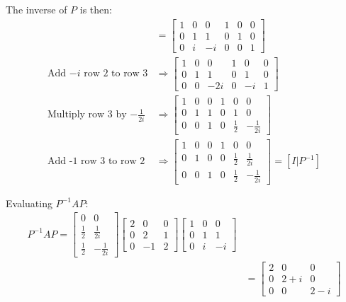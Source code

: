 \documentclass[11pt]{homework}
\begin{document}
The inverse of $P$ is then:
\begin{align*}
[P|I] &= 
  \left[
  \begin{array}{ccc|ccc}
    1 & 0 & 0 & 1 & 0 & 0 \\
    0 & 1 & 1 & 0 & 1 & 0 \\
    0 & i & -i & 0 & 0 & 1 
  \end{array}
  \right] \\
\text{Add $-i$ row 2 to row 3}
  &\Rightarrow
  \left[
  \begin{array}{ccc|ccc}
    1 & 0 & 0   & 1 & 0  & 0 \\
    0 & 1 & 1   & 0 & 1  & 0 \\
    0 & 0 & -2i & 0 & -i & 1 
  \end{array}
  \right] \\
\text{Multiply row 3 by $-\frac{1}{2i}$}
  &\Rightarrow
  \left[
  \begin{array}{ccc|ccc}
    1 & 0 & 0 & 1 & 0  & 0 \\
    0 & 1 & 1 & 0 & 1  & 0 \\
    0 & 0 & 1 & 0 & \frac{1}{2} & -\frac{1}{2i}
  \end{array}
  \right] \\
\text{Add -1 row 3 to row 2}
  &\Rightarrow
  \left[
  \begin{array}{ccc|ccc}
    1 & 0 & 0 & 1 & 0  & 0 \\
    0 & 1 & 0 & 0 & \frac{1}{2}  & \frac{1}{2i} \\
    0 & 0 & 1 & 0 & \frac{1}{2} & -\frac{1}{2i}
  \end{array}
  \right]  = [I|P^{-1}]
\end{align*}

Evaluating $P^{-1}AP$:
\begin{align*}
P^{-1}AP = 
  \begin{bmatrix}
    0  & 0 \\
    \frac{1}{2}  & \frac{1}{2i} \\
    \frac{1}{2} & -\frac{1}{2i}
  \end{bmatrix}
  \begin{bmatrix}
    2 & 0 & 0 \\
    0 & 2 & 1 \\
    0 & -1 & 2 
  \end{bmatrix}
  \begin{bmatrix}
    1 & 0 & 0  \\
    0 & 1 & 1  \\
    0 & i & -i
  \end{bmatrix} \\
  &=
  \begin{bmatrix}
    2 & 0 & 0 \\
    0 & 2+i & 0 \\
    0 & 0 & 2-i
  \end{bmatrix}
\end{align*}
\end{document}
